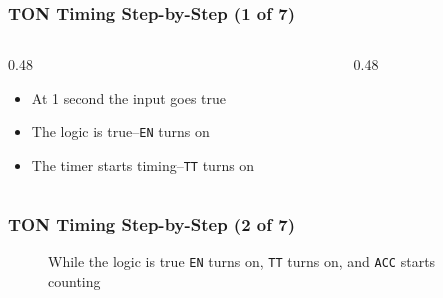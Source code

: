 \begin{frame}
    \frametitle{TON Timing Step-by-Step (1 of 7)}

    \begin{columns}
        \begin{column}{0.48\linewidth}
            \begin{itemize}
                \item At 1 second the input goes true
                \item The logic is true--\texttt{EN} turns on
                \item The timer starts timing--\texttt{TT} turns on
            \end{itemize}
        \end{column}
        \begin{column}{0.48\linewidth}
            \begin{figure}
                \centering
                \resizebox{\columnwidth}{!}{
                    
                }
            \end{figure}  
        \end{column}
    \end{columns}
\end{frame}

\begin{frame}
    \frametitle{TON Timing Step-by-Step (2 of 7)}

    \begin{figure}
        \centering
        
        
        \vspace{1em}
        {\small While the logic is true \texttt{EN} turns on, \texttt{TT} turns on, and \texttt{ACC} starts counting\par}
    \end{figure}
\end{frame}


